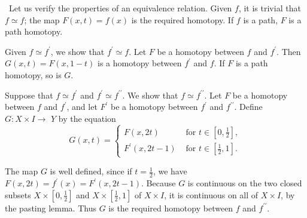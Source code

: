 \documentclass[12pt,a4paper]{book}
\newenvironment{prooff}{{\noindent\it\textcolor{cyan!40!black}{Proof}:}\,}{\par}
\theoremstyle{definition}
\begin{document}
\begin{prooff}
    Let us verify the properties of an equivalence relation.
    Given $f$, it is trivial that $f \simeq f$; the map $F(x, t)=f(x)$ is the required homotopy. If $f$ is a path, $F$ is a path homotopy.

    Given $f \simeq f^{\prime}$, we show that $f^{\prime} \simeq f$. Let $F$ be a homotopy between $f$ and $f^{\prime}$. Then $G(x, t)=F(x, 1-t)$ is a homotopy between $f^{\prime}$ and $f$. If $F$ is a path homotopy, so is $G$.

    Suppose that $f \simeq f^{\prime}$ and $f^{\prime} \simeq f^{\prime \prime}$. We show that $f \simeq f^{\prime \prime}$. Let $F$ be a homotopy between $f$ and $f^{\prime}$, and let $F^{\prime}$ be a homotopy between $f^{\prime}$ and $f^{\prime \prime}$. Define $G: X \times I \rightarrow$ $Y$ by the equation
    $$
        G(x, t)= \begin{cases}F(x, 2 t) & \text { for } t \in\left[0, \frac{1}{2}\right], \\ F^{\prime}(x, 2 t-1) & \text { for } t \in\left[\frac{1}{2}, 1\right] .\end{cases}
    $$

    The map $G$ is well defined, since if $t=\frac{1}{2}$, we have $F(x, 2 t)=f^{\prime}(x)=F^{\prime}(x, 2 t-1)$. Because $G$ is continuous on the two closed subsets $X \times\left[0, \frac{1}{2}\right]$ and $X \times\left[\frac{1}{2}, 1\right]$ of $X \times I$, it is continuous on all of $X \times I$, by the pasting lemma. Thus $G$ is the required homotopy between $f$ and $f^{\prime \prime}$.
\end{prooff}
\end{document}
